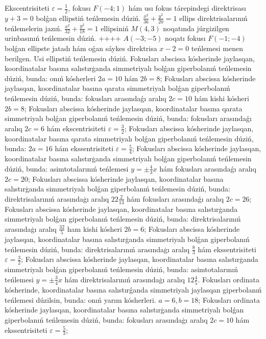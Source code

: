 Ekscentrisiteti $\varepsilon=\frac{1}{2}$, fokusı $F (-4; 1) $ hám usı fokus tárepindegi direktrisası $y+3=0$ bolǵan ellipstiń teńlemesin dúziń.
$\frac{x^2}{36}+\frac{y^2}{20}=1$ ellips direktrisalarınıń teńlemelerin jazıń.
$\frac{x^2}{32}+\frac{y^2}{18}=1$ ellipsiniń $M (4,3) $ noqatında júrgizilgen urinbasınıń teńlemesin dúziń.
++++
$A (-3;-5) $ noqatı fokusı $F (-1;-4) $ bolǵan ellipste jatadı hám oǵan sáykes direktrisa $x-2=0$ teńlemesi menen berilgen. Usi ellipstiń teńlemesin dúziń.
Fokusları abscissa kósherinde jaylasqan, koordinatalar basına salıstırģanda simmetriyalı bolǵan giperbolanıń teńlemesin dúziń, bunda: onıń kósherleri $2 a=10$ hám $2 b=8$;
Fokusları abscissa kósherinde jaylasqan, koordinatalar basına qarata simmetriyalı bolǵan giperbolanıń teńlemesin dúziń, bunda: fokusları arasındaǵı aralıq $2 c=10$ hám kishi kósheri $2 b=8$;
Fokusları abscissa kósherinde jaylasqan, koordinatalar basına qarata simmetriyalı bolǵan giperbolanıń teńlemesin dúziń, bunda: fokusları arasındaǵı aralıq $2 c=6$ hám ekscentrisiteti $\varepsilon=\frac{3}{2}$;
Fokusları abscissa kósherinde jaylasqan, koordinatalar basına qarata simmetriyalı bolǵan giperbolanıń teńlemesin dúziń, bunda: $2 a=16$ hám ekssentrisiteti $\varepsilon=\frac{5}{4}$;
Fokusları abscissa kósherinde jaylasqan, koordinatalar basına salıstırģanda simmetriyalı bolǵan giperbolanıń teńlemesin dúziń, bunda: asimtotalarınıń teńlemesi $y= \pm \frac{4}{3} x$ hám fokusları arasındaǵı aralıq $2 c=20$;
Fokusları abscissa kósherinde jaylasqan, koordinatalar basına salıstırģanda simmetriyalı bolǵan giperbolanıń teńlemesin dúziń, bunda: direktrisalarınıń arasındaģı aralıq $22 \frac{2}{13}$ hám fokusları arasındaǵı aralıq $2 c=26$;
Fokusları abscissa kósherinde jaylasqan, koordinatalar basına salıstırģanda simmetriyalı bolǵan giperbolanıń teńlemesin dúziń, bunda: direktrisalarınıń arasındaģı aralıq $\frac{32}{5}$ ham kishi kósheri $2 b=6$;
Fokusları abscissa kósherinde jaylasqan, koordinatalar basına salıstırģanda simmetriyalı bolǵan giperbolanıń teńlemesin dúziń, bunda: direktrisalarınıń arasındaģı aralıq $\frac{8}{3}$ hám ekssentrisiteti $\varepsilon=\frac{3}{2}$;
Fokusları abscissa kósherinde jaylasqan, koordinatalar basına salıstırģanda simmetriyalı bolǵan giperbolanıń teńlemesin dúziń, bunda: asimtotalarınıń teńlemesi $y= \pm \frac{3}{4} x$ hám direktrisalarınıń arasındaģı aralıq $12 \frac{4}{5}$.
Fokusları ordinata kósherinde, koordinatalar basına salıstırǵanda simmetriyalı jaylasqan giperbolanıń teńlemesi dúzilsin, bunda: onıń yarım kósherleri. $a=6, b=18$;
Fokusları ordinata kósherinde jaylasqan, koordinatalar basına salıstırģanda simmetriyalı bolǵan giperbolanıń teńlemesin dúziń, bunda: fokusları arasındaģı aralıq $2 c=10$ hám ekssentrisiteti $\varepsilon=\frac{5}{3}$;
